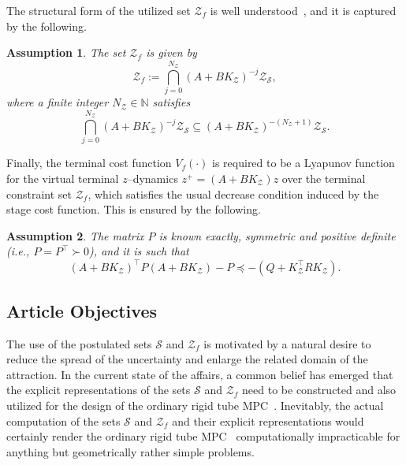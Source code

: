 \documentclass[twocolumn]{autart}
\newtheorem{assumption}{Assumption}
\newcommand{\mb}[1]{\mathbb{#1}}
\newcommand{\mc}[1]{\mathcal{#1}}
\newcommand{\bb}{\left(\cdot\right)}
\newcommand{\N}{\mb{N}}
\numberwithin{equation}{section}
\begin{document}
The structural form of the utilized set $\mc{Z}_f$ is well understood~\cite{gilbert:tan:1991,rakovic:zhang:2023:a,rakovic:zhang:2023:b}, and it is captured by the following.
\begin{assumption}
\label{ass:02.09}
 The set $\mc{Z}_f$ is given by
 \begin{equation}
 \label{eq:02.16}
 \mc{Z}_f:=\bigcap_{j=0}^{N_\mc{Z}}(A+BK_\mc{Z})^{-j}\mc{Z}_\mc{S},
 \end{equation}
where a finite integer $N_\mc{Z}\in\N$ satisfies
 \begin{equation}
 \label{eq:02.17}
 \bigcap_{j=0}^{N_\mc{Z}}(A+BK_\mc{Z})^{-j}\mc{Z}_\mc{S}\subseteq (A+BK_\mc{Z})^{-(N_\mc{Z}+1)}\mc{Z}_\mc{S}.
 \end{equation} 
\end{assumption}
Finally, the terminal cost function $V_f\bb$ is required to be a Lyapunov function for the virtual terminal $z$--dynamics $z^+=(A+BK_\mc{Z})z$ over the terminal constraint set $\mc{Z}_f$, which satisfies the usual decrease condition induced by the stage cost function. This is ensured by the following.
\begin{assumption} 
\label{ass:02.10}
 The matrix $P$ is known exactly, symmetric and positive definite (i.e., $P=P^\top \succ 0$), and it is such that
 \begin{equation}
 \label{eq:02.18}
 (A+BK_\mc{Z})^\top P (A+BK_\mc{Z}) - P \preceq -(Q+K_\mc{Z}^\top R K_\mc{Z}).
 \end{equation}
\end{assumption}


\subsection{Article Objectives}
\label{sec:02.04}

The use of the postulated sets $\mc{S}$ and $\mc{Z}_f$ is motivated by a natural desire to reduce the spread of the uncertainty and enlarge the related domain of the attraction. In the current state of the affairs, a common belief has emerged that the explicit representations of the sets $\mc{S}$ and $\mc{Z}_f$ need to be constructed and also utilized for the design of the ordinary rigid tube MPC~\cite{mayne:seron:rakovic:2005}. Inevitably, the actual computation of the sets $\mc{S}$ and $\mc{Z}_f$ and their explicit representations would certainly render the ordinary rigid tube MPC~\cite{mayne:seron:rakovic:2005} computationally impracticable for anything but geometrically rather simple problems. 
\end{document}
